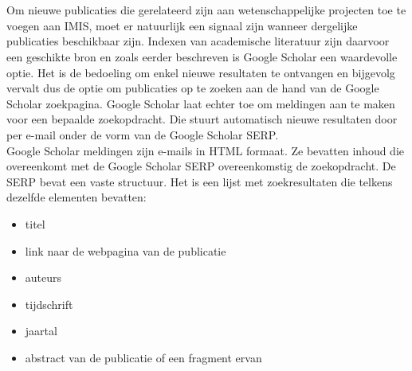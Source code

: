 
\chapter{}%
\label{ch:methodologie}

Om nieuwe publicaties die gerelateerd zijn aan wetenschappelijke projecten toe te voegen aan IMIS, moet er natuurlijk een signaal zijn wanneer dergelijke publicaties beschikbaar zijn. Indexen van academische literatuur zijn daarvoor een geschikte bron en zoals eerder beschreven is Google Scholar een waardevolle optie. Het is de bedoeling om enkel nieuwe resultaten te ontvangen en bijgevolg vervalt dus de optie om publicaties op te zoeken aan de hand van de Google Scholar zoekpagina. Google Scholar laat echter toe om meldingen aan te maken voor een bepaalde zoekopdracht. Die stuurt automatisch nieuwe resultaten door per e-mail onder de vorm van de Google Scholar SERP.\\
Google Scholar meldingen zijn e-mails in HTML formaat. Ze bevatten inhoud die overeenkomt met de Google Scholar SERP overeenkomstig de zoekopdracht. De SERP bevat een vaste structuur. Het is een lijst met zoekresultaten die telkens dezelfde elementen bevatten:
\begin{itemize}
    \item titel
    \item link naar de webpagina van de publicatie
    \item auteurs
    \item tijdschrift
    \item jaartal
    \item abstract van de publicatie of een fragment ervan
\end{itemize}

